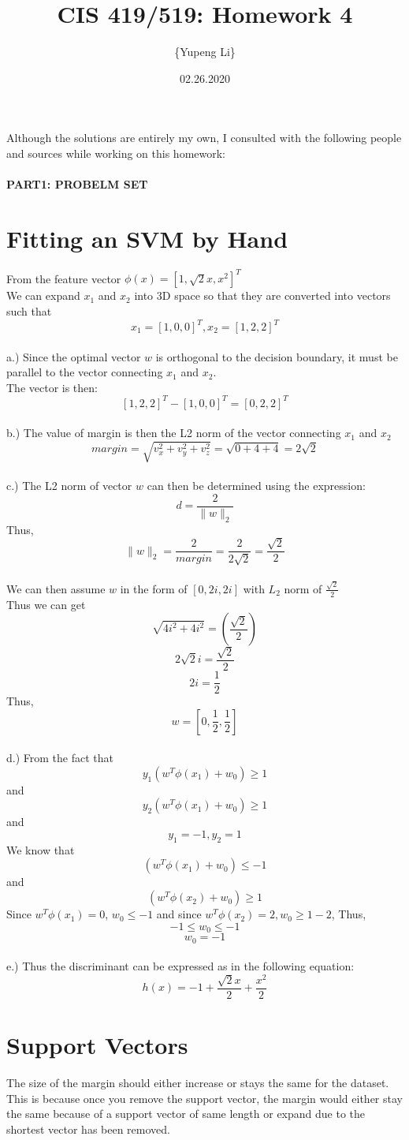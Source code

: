 \documentclass{article}
\title{CIS 419/519: Homework 4}
\author{\{Yupeng Li\}}
\date{02.26.2020}
\begin{document}
    \maketitle
    Although the solutions are entirely my own, I consulted with the following people and sources while working on this homework:
    
    \paragraph{PART1: PROBELM SET}

    \section{Fitting an SVM by Hand}
    From the feature vector $\phi(x) = [1, \sqrt{2} x, x^2]^T$
    \\We can expand $x_1$ and $x_2$ into 3D space so that they are converted into vectors such that
    \[x_1 = [1,0,0]^T ,  x_2 = [1,2,2]^T\]
\\a.) Since the optimal vector $w$ is orthogonal to the decision boundary, it must be parallel to the vector connecting $x_1$ and $x_2$.\\
The vector is then:
\[[1,2,2]^T - [1,0,0]^T = [0,2,2]^T\]
\\b.) The value of margin is then the L2 norm of the vector connecting $x_1$ and $x_2$
\[margin = \sqrt{v_x^2 + v_y^2 + v_z^2} = \sqrt{0 + 4 +4} = 2\sqrt{2}\]
\\c.) The L2 norm of vector $w$ can then be determined using the expression:
\[d = \frac{2}{\|w\|_2}\]
Thus, \[\|w\|_2 = \frac{2}{margin} = \frac{2}{2\sqrt{2}} = \frac{\sqrt{2}}{2}\] 
\\We can then assume $w$ in the form of $[0,2i,2i]$ with $L_2$ norm of $\frac{\sqrt{2}}{2}$\\
Thus we can get \[\sqrt{4i^2 + 4i^2} = (\frac{\sqrt{2}}{2})\]
\[2\sqrt{2} i = \frac{\sqrt{2}}{2}\]
\[2i = \frac{1}{2}\]
Thus,\[ w = [0, \frac{1}{2},\frac{1}{2}]\]
\\d.) From the fact that 
\[y_1(w^T\phi(x_1) + w_0) \geq  1\]
and \[y_2(w^T\phi(x_1) + w_0) \geq  1\]
and \[y_1 = -1, y_2 = 1\]
We know that \[(w^T\phi(x_1) + w_0) \leq  -1\]
and \[(w^T\phi(x_2) + w_0) \geq  1\]
Since $w^T \phi(x_1) = 0$, $w_0 \leq -1$ and since $w^T \phi(x_2) = 2, w_0 \geq 1-2$, Thus,
\[-1 \leq w_0 \leq -1\]\[w_0 = -1\]
\\e.) Thus the discriminant can be expressed as in the following equation:
\begin{equation}
h(x) = -1 + \frac{\sqrt{2}x}{2} + \frac{x^2}{2}
\end{equation}

   \section{Support Vectors}
  	The size of the margin should either increase or stays the same for the dataset. This is because once you remove the support vector, the margin would either stay the same because of a support vector of same length or expand due to the shortest vector has been removed.

        
\end{document}

